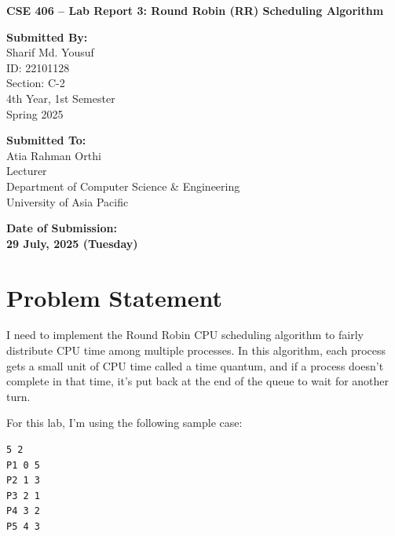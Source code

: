 \documentclass[12pt,a4paper]{article}
\begin{document}
\begin{titlepage}
  \centering
  \vspace*{3cm}

  {\Huge\bfseries CSE 406 – Lab Report 3: Round Robin (RR) Scheduling Algorithm \par}
  \vspace{2.5cm}

  \noindent
  \begin{minipage}[t]{0.48\textwidth}
    {\large\bfseries Submitted By:}\\[0.5em]
    \Large
    Sharif Md. Yousuf \\
    ID: 22101128 \\
    Section: C-2 \\
    4th Year, 1st Semester \\
    Spring 2025
  \end{minipage}
  \hfill
  \begin{minipage}[t]{0.48\textwidth}
    {\large\bfseries Submitted To:}\\[0.5em]
    \Large
    Atia Rahman Orthi \\
    Lecturer \\
    Department of Computer Science \& Engineering \\
    University of Asia Pacific
  \end{minipage}

  \vfill

  {\Large\bfseries Date of Submission:} \\[0.5em]
  {\LARGE\bfseries 29 July, 2025 (Tuesday)}

  \vspace*{2cm}
\end{titlepage}

\section{Problem Statement}
I need to implement the Round Robin CPU scheduling algorithm to fairly distribute CPU time among multiple processes. In this algorithm, each process gets a small unit of CPU time called a time quantum, and if a process doesn't complete in that time, it's put back at the end of the queue to wait for another turn.

For this lab, I'm using the following sample case:

\begin{verbatim}
5 2
P1 0 5
P2 1 3
P3 2 1
P4 3 2
P5 4 3
\end{verbatim}
\end{document}
